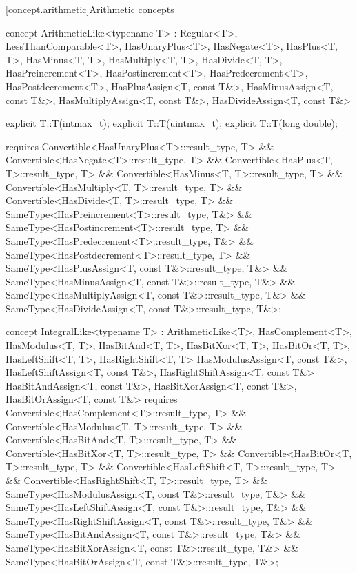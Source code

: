 \documentclass[american,twoside]{book}
\begin{document}
[concept.arithmetic]{Arithmetic concepts}

\begin{itemdecl}
concept ArithmeticLike<typename T> 
  : Regular<T>, LessThanComparable<T>, HasUnaryPlus<T>, HasNegate<T>,
    HasPlus<T, T>, HasMinus<T, T>, HasMultiply<T, T>, HasDivide<T, T>, 
    HasPreincrement<T>, HasPostincrement<T>, HasPredecrement<T>, HasPostdecrement<T>,
    HasPlusAssign<T, const T&>, HasMinusAssign<T, const T&>,
    HasMultiplyAssign<T, const T&>, HasDivideAssign<T, const T&> {
  explicit T::T(intmax_t);
  explicit T::T(uintmax_t);
  explicit T::T(long double);

  requires Convertible<HasUnaryPlus<T>::result_type, T>
        && Convertible<HasNegate<T>::result_type, T>
        && Convertible<HasPlus<T, T>::result_type, T>
        && Convertible<HasMinus<T, T>::result_type, T>
        && Convertible<HasMultiply<T, T>::result_type, T>
        && Convertible<HasDivide<T, T>::result_type, T>
        && SameType<HasPreincrement<T>::result_type, T&>
        && SameType<HasPostincrement<T>::result_type, T>
        && SameType<HasPredecrement<T>::result_type, T&>
        && SameType<HasPostdecrement<T>::result_type, T>
        && SameType<HasPlusAssign<T, const T&>::result_type, T&>
        && SameType<HasMinusAssign<T, const T&>::result_type, T&>
        && SameType<HasMultiplyAssign<T, const T&>::result_type, T&>
        && SameType<HasDivideAssign<T, const T&>::result_type, T&>;
}
\end{itemdecl}

\begin{itemdescr}
\pnum
{}
\end{itemdescr}

\begin{itemdecl}
concept IntegralLike<typename T> 
  : ArithmeticLike<T>, 
    HasComplement<T>, HasModulus<T, T>, HasBitAnd<T, T>, HasBitXor<T, T>, HasBitOr<T, T>,
    HasLeftShift<T, T>, HasRightShift<T, T> 
    HasModulusAssign<T, const T&>, HasLeftShiftAssign<T, const T&>, HasRightShiftAssign<T, const T&>
    HasBitAndAssign<T, const T&>, HasBitXorAssign<T, const T&>, HasBitOrAssign<T, const T&> {
  requires Convertible<HasComplement<T>::result_type, T>
        && Convertible<HasModulus<T, T>::result_type, T>
        && Convertible<HasBitAnd<T, T>::result_type, T>
        && Convertible<HasBitXor<T, T>::result_type, T>
        && Convertible<HasBitOr<T, T>::result_type, T>
        && Convertible<HasLeftShift<T, T>::result_type, T>
        && Convertible<HasRightShift<T, T>::result_type, T>
        && SameType<HasModulusAssign<T, const T&>::result_type, T&>
        && SameType<HasLeftShiftAssign<T, const T&>::result_type, T&>
        && SameType<HasRightShiftAssign<T, const T&>::result_type, T&>
        && SameType<HasBitAndAssign<T, const T&>::result_type, T&>
        && SameType<HasBitXorAssign<T, const T&>::result_type, T&>
        && SameType<HasBitOrAssign<T, const T&>::result_type, T&>;
}
\end{itemdecl}
\end{document}
